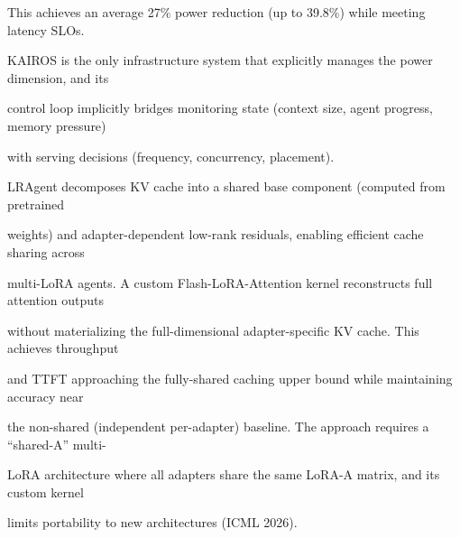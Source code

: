 \begin{flushleft}
\noindent This achieves an average 27\% power reduction (up to 39.8\%) while meeting latency SLOs.\par
\noindent KAIROS is the only infrastructure system that explicitly manages the power dimension, and its\par
\noindent control loop implicitly bridges monitoring state (context size, agent progress, memory pressure)\par
\noindent with serving decisions (frequency, concurrency, placement).\par
\noindent  LRAgent decomposes KV cache into a shared base component (computed from pretrained\par
\noindent weights) and adapter-dependent low-rank residuals, enabling efficient cache sharing across\par
\noindent multi-LoRA agents. A custom Flash-LoRA-Attention kernel reconstructs full attention outputs\par
\noindent without materializing the full-dimensional adapter-specific KV cache. This achieves throughput\par
\noindent and TTFT approaching the fully-shared caching upper bound while maintaining accuracy near\par
\noindent the non-shared (independent per-adapter) baseline. The approach requires a “shared-A” multi-\par
\noindent LoRA architecture where all adapters share the same LoRA-A matrix, and its custom kernel\par
\noindent limits portability to new architectures (ICML 2026).\par
\end{flushleft}
